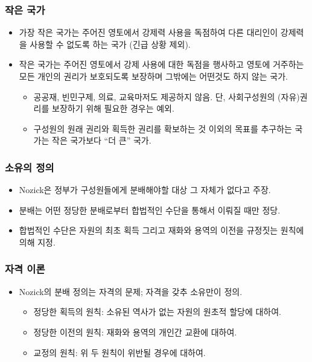 \documentclass[aspectratio=169,xcolor=dvipsnames,handout]{beamer}
\begin{document}
\begin{frame}[<+->]
\frametitle{작은 국가}
    \begin{itemize}
        \item 가장 작은 국가는 주어진 영토에서 강제력 사용을 독점하여 다른 대리인이 강제력을 사용할 수 없도록 하는 국가 (긴급 상황 제외).
        \item 작은 국가는 주어진 영토에서 강제 사용에 대한 독점을 행사하고 영토에 거주하는 모든 개인의 권리가 보호되도록 보장하며 그밖에는 어떤것도 하지 않는 국가.
        \begin{itemize}
            \item 공공재, 빈민구제, 의료, 교육마저도 제공하지 않음. 단, 사회구성원의 (자유)권리를 보장하기 위해 필요한 경우는 예외.
            \item 구성원의 원래 권리와 획득한 권리를 확보하는 것 이외의 목표를 추구하는 국가는 작은 국가보다 ``더 큰'' 국가.
        \end{itemize}
    \end{itemize}
\end{frame}

\begin{frame}[<+->]
\frametitle{소유의 정의}
    \begin{itemize}
        \item Nozick은 정부가 구성원들에게 분배해야할 대상 그 자체가 없다고 주장.
        \item 분배는 어떤 정당한 분배로부터 합법적인 수단을 통해서 이뤄질 때만 정당.
        \item 합법적인 수단은 자원의 최초 획득 그리고 재화와 용역의 이전을 규정짓는 원칙에 의해 지정.
    \end{itemize}
\end{frame}


\begin{frame}[<+->]
\frametitle{자격 이론}
    \begin{itemize}
        \item Nozick의 분배 정의는 자격의 문제; 자격을 갖추 소유만이 정의.
        \begin{itemize}
            \item 정당한 획득의 원칙: 소유된 역사가 없는 자원의 원초적 할당에 대하여.
            \item 정당한 이전의 원칙: 재화와 용역의 개인간 교환에 대하여.
            \item 교정의 원칙: 위 두 원칙이 위반될 경우에 대하여.
        \end{itemize}
    \end{itemize}
\end{frame}
  
\end{document}
